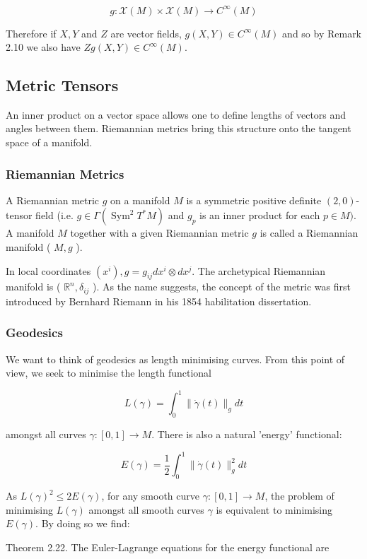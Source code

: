 \documentclass[10pt, letterpaper]{article}
\begin{document}
$$
g: \mathscr{X}(M) \times \mathscr{X}(M) \rightarrow C^{\infty}(M)
$$

Therefore if $X, Y$ and $Z$ are vector fields, $g(X, Y) \in C^{\infty}(M)$ and so by Remark 2.10 we also have $Z g(X, Y) \in C^{\infty}(M)$.

\subsection*{Metric Tensors}
An inner product on a vector space allows one to define lengths of vectors and angles between them. Riemannian metrics bring this structure onto the tangent space of a manifold.

\subsubsection*{Riemannian Metrics}
A Riemannian metric $g$ on a manifold $M$ is a symmetric positive definite $(2,0)$-tensor field (i.e. $g \in \Gamma\left(\operatorname{Sym}^{2} T^{*} M\right)$ and $g_{p}$ is an inner product for each $p \in M)$. A manifold $M$ together with a given Riemannian metric $g$ is called a Riemannian manifold ( $M, g$ ).

In local coordinates $\left(x^{i}\right), g=g_{i j} d x^{i} \otimes d x^{j}$. The archetypical Riemannian manifold is ( $\mathbb{R}^{n}, \delta_{i j}$ ). As the name suggests, the concept of the metric was first introduced by Bernhard Riemann in his 1854 habilitation dissertation.

\subsubsection*{Geodesics}
We want to think of geodesics as length minimising curves. From this point of view, we seek to minimise the length functional

$$
L(\gamma)=\int_{0}^{1}\|\dot{\gamma}(t)\|_{g} d t
$$

amongst all curves $\gamma:[0,1] \rightarrow M$. There is also a natural 'energy' functional:

$$
E(\gamma)=\frac{1}{2} \int_{0}^{1}\|\dot{\gamma}(t)\|_{g}^{2} d t
$$

As $L(\gamma)^{2} \leq 2 E(\gamma)$, for any smooth curve $\gamma:[0,1] \rightarrow M$, the problem of minimising $L(\gamma)$ amongst all smooth curves $\gamma$ is equivalent to minimising $E(\gamma)$. By doing so we find:

Theorem 2.22. The Euler-Lagrange equations for the energy functional are
\end{document}
